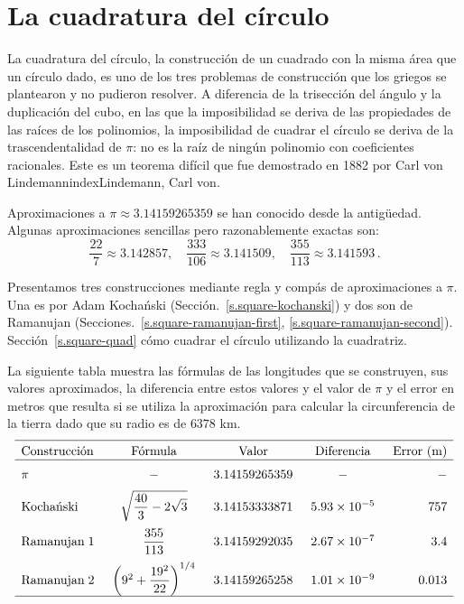 
\chapter{La cuadratura del círculo}\label{c.square}


La cuadratura del círculo, la construcción de un cuadrado con la misma área que un círculo dado, es uno de los tres problemas de construcción que los griegos se plantearon y no pudieron resolver. A diferencia de la trisección del ángulo y la duplicación del cubo, en las que la imposibilidad se deriva de las propiedades de las raíces de los polinomios, la imposibilidad de cuadrar el círculo se deriva de la trascendentalidad de $\pi$: no es la raíz de ningún polinomio con coeficientes racionales. Este es un teorema difícil que fue demostrado en 1882 por Carl von Lindemannindex{Lindemann, Carl von}.

Aproximaciones a $\pi\approx 3.14159265359$ se han conocido desde la antigüedad. Algunas aproximaciones sencillas pero razonablemente exactas son:
\[
\displaystyle\frac{22}{7}\approx 3.142857,\quad \displaystyle\frac{333}{106}\approx 3.141509,\quad \displaystyle\frac{355}{113}\approx 3.141593\,.
\]

Presentamos tres construcciones mediante regla y compás de aproximaciones a $\pi$. Una es por Adam Kocha\'{n}ski (Sección.~\ref{s.square-kochanski}) y dos son de Ramanujan (Secciones.~\ref{s.square-ramanujan-first}, \ref{s.square-ramanujan-second}). Sección~\ref{s.square-quad} cómo cuadrar el círculo utilizando la cuadratriz.

La siguiente tabla muestra las fórmulas de las longitudes que se construyen, sus valores aproximados, la diferencia entre estos valores y el valor de $\pi$ y el error en metros que resulta si se utiliza la aproximación para calcular la circunferencia de la tierra dado que su radio es de $6378$ km.
\[
\begin{array}{l@{\hspace{5mm}}c@{\hspace{5mm}}c@{\hspace{5mm}}c@{\hspace{5mm}}r}
\hline\noalign{\smallskip}
\textrm{Construcción} & \textrm{Fórmula} &\textrm{Valor} & \textrm{Diferencia} & \textrm{Error (m)}\\\hline\noalign{\medskip}
\pi & -& 3.14159265359 & - & -\\\noalign{\medskip}
\textrm{Kocha\'{n}ski} & \sqrt{\displaystyle\frac{40}{3}-2\sqrt{3}}&
  3.14153333871 & 5.93 \times 10^{-5} & 757\\\noalign{\medskip}
\textrm{Ramanujan}\; 1 & \displaystyle\frac{355}{113} &
  3.14159292035 &2.67  \times 10^{-7}&3.4\\\noalign{\medskip}
\textrm{Ramanujan}\; 2 &\left(9^2+\displaystyle\frac{19^2}{22}\right)^{1/4}&
  3.14159265258 & 1.01 \times 10^{-9}& 0.013\\
\hline\noalign{\smallskip}
\end{array}
\]


